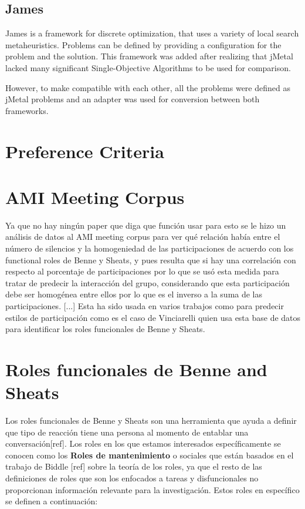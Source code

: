 \subsection{James}
James is a framework for discrete optimization, that uses a variety of local search metaheuristics. Problems can be defined by providing a configuration for the problem and the solution. This framework was added after realizing that jMetal lacked many significant Single-Objective Algorithms to be used for comparison. 

However, to make compatible with each other, all the problems were defined as jMetal problems and an adapter was used for conversion between both frameworks.



\section{Preference Criteria}


\section{AMI Meeting Corpus}

Ya que no hay ningún paper que diga que función usar para esto se le hizo un análisis de datos al AMI meeting corpus para ver qué relación había entre el número de silencios y la homogeniedad de las participaciones de acuerdo con los functional roles de Benne y Sheats, y pues resulta que si hay una correlación con respecto al porcentaje de participaciones por lo que se usó esta medida para tratar de predecir la interacción del grupo, considerando que esta participación debe ser homogénea entre ellos por lo que es el inverso a la suma de las participaciones.
[...]
Esta ha sido usada en varios trabajos como para predecir estilos de participación como es el caso de Vinciarelli\cite{VinciarelliUnderstandingCorpus} quien usa esta base de datos para identificar los roles funcionales de Benne y Sheats\cite{benne_sheats}. 

\section{Roles funcionales de Benne and Sheats }
Los roles funcionales de Benne y Sheats son una herramienta que ayuda a definir que tipo de reacción tiene una persona al momento de entablar una conversación[ref]. Los roles en los que estamos interesados específicamente se conocen como los \textbf{Roles de mantenimiento} o sociales que están basados en el trabajo de Biddle [ref] sobre la teoría de los roles, ya que el resto de las definiciones de roles que son los enfocados a tareas y disfuncionales no proporcionan información relevante para la investigación. Estos roles en específico se definen a continuación:


